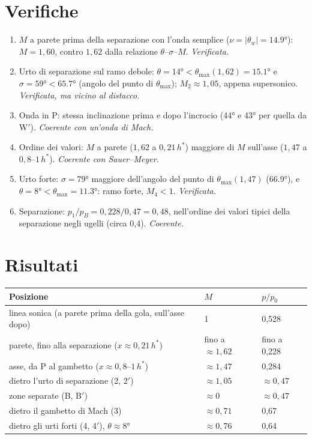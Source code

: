\documentclass[11pt,a4paper]{article}
\begin{document}
\section{Verifiche}
\begin{enumerate}
\item $M$ a parete prima della separazione con l'onda semplice ($\nu=|\theta_w|=\ang{14.9}$): $M=1{,}60$, contro
  $1{,}62$ dalla relazione $\theta$--$\sigma$--$M$. \emph{Verificata.}
\item Urto di separazione sul ramo debole: $\theta=\ang{14}<\theta_{\max}(1{,}62)=\ang{15.1}$ e
  $\sigma=\ang{59}<\ang{65.7}$ (angolo del punto di $\theta_{\max}$); $M_2\approx1{,}05$, appena supersonico.
  \emph{Verificata, ma vicino al distacco.}
\item Onda in P: stessa inclinazione prima e dopo l'incrocio (\ang{44} e \ang{43} per quella da W$'$). \emph{Coerente con
  un'onda di Mach.}
\item Ordine dei valori: $M$ a parete ($1{,}62$ a $0{,}21\,h^*$) maggiore di $M$ sull'asse ($1{,}47$ a $0{,}8$--$1\,h^*$).
  \emph{Coerente con Sauer--Meyer.}
\item Urto forte: $\sigma=\ang{79}$ maggiore dell'angolo del punto di $\theta_{\max}(1{,}47)$ (\ang{66.9}), e
  $\theta=\ang{8}<\theta_{\max}=\ang{11.3}$: ramo forte, $M_4<1$. \emph{Verificata.}
\item Separazione: $p_1/p_B=0{,}228/0{,}47=0{,}48$, nell'ordine dei valori tipici della separazione negli ugelli
  (circa 0,4). \emph{Coerente.}
\end{enumerate}

\section{Risultati}
\begin{table}[H]
  \centering
  \begin{tabular}{lll}
    \toprule
    Posizione & $M$ & $p/p_0$ \\
    \midrule
    linea sonica (a parete prima della gola, sull'asse dopo) & 1 & 0,528 \\
    parete, fino alla separazione ($x\approx0{,}21\,h^*$) & fino a $\approx1{,}62$ & fino a 0,228 \\
    asse, da P al gambetto ($x\approx0{,}8$--$1\,h^*$) & $\approx1{,}47$ & 0,284 \\
    dietro l'urto di separazione (2, 2$'$) & $\approx1{,}05$ & $\approx0{,}47$ \\
    zone separate (B, B$'$) & $\approx0$ & $\approx0{,}47$ \\
    dietro il gambetto di Mach (3) & $\approx0{,}71$ & 0,67 \\
    dietro gli urti forti (4, 4$'$), $\theta\approx\ang{8}$ & $\approx0{,}76$ & 0,64 \\
    \bottomrule
  \end{tabular}
\end{table}
\end{document}
